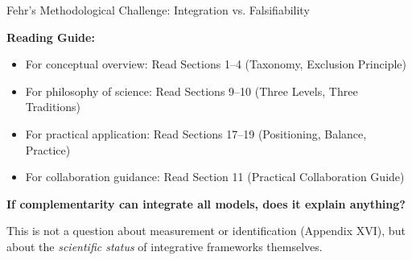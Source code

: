 \begin{chapter}{Fehr's Methodological Challenge: Integration vs. Falsifiability}
\begin{tcolorbox}[colback=purple!5!white, colframe=purple!75!black,
    title=Chapter Linkage]
\textbf{Reading Guide:}
\begin{itemize}[nosep]
\item For conceptual overview: Read Sections 1--4 (Taxonomy, Exclusion Principle)
\item For philosophy of science: Read Sections 9--10 (Three Levels, Three Traditions)
\item For practical application: Read Sections 17--19 (Positioning, Balance, Practice)
\item For collaboration guidance: Read Section 11 (Practical Collaboration Guide)
\end{itemize}

\end{tcolorbox}

\begin{abstract}
This appendix formalizes a meta-level critique of complementarity frameworks that is implicit in Ernst Fehr's methodological position but rarely stated explicitly: \textbf{the tension between model integration and scientific falsifiability}. Unlike the ten canonical arguments (Appendix XVI), which concern measurement, identification, or complexity, Fehr's deeper concern is epistemological: if a framework can integrate all models, it loses the disciplinary power that makes models scientific. This appendix (1) reconstructs Fehr's position from his methodological commitments, (2) shows how complementarity ($\gamma$) can either confirm or refute this concern depending on its use, and (3) proposes a resolution: $\gamma$ as an \textit{exclusion principle}, not an integration principle. The central claim: complementarity is scientifically legitimate precisely when it tells us what is \textit{not} complementary.
\end{abstract}

\begin{tcolorbox}[colback=red!5!white,colframe=red!75!black,title=\textbf{The Fundamental Question}]
\begin{center}
\large
\textbf{If complementarity can integrate all models, does it explain anything?}
\end{center}

\vspace{0.5em}
This is not a question about measurement or identification (Appendix XVI), but about the \textit{scientific status} of integrative frameworks themselves.
\end{tcolorbox}


\end{chapter}
